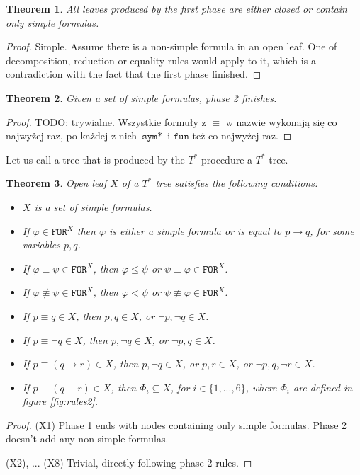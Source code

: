 \documentclass{article}
\newtheorem{theorem}{Theorem}
\theoremstyle{definition}
\newcommand*{\Ts}{T^*}
\newcommand*{\id}{\equiv}
\newcommand*{\ra}{\rightarrow}
\newcommand*{\FOR}{\texttt{FOR}}
\begin{document}
\begin{theorem}
    All leaves produced by the first phase are either closed or contain only simple formulas.
\end{theorem}
\begin{proof}
    Simple. Assume there is a non-simple formula in an open leaf. One of decomposition, reduction or equality rules would apply to it, which is a contradiction with the fact that the first phase finished.
\end{proof}

\begin{theorem}
    Given a set of simple formulas, phase 2 finishes.
\end{theorem}
\begin{proof}
    TODO: trywialne. Wszystkie formuły z $\id$ w nazwie wykonają się co najwyżej raz, po każdej z nich $\texttt{sym}*$ i $\texttt{fun}$ też co najwyżej raz.
\end{proof}

Let us call a tree that is produced by the $\Ts$ procedure a $\Ts$ tree.

\begin{theorem}
    Open leaf $X$ of a $\Ts$ tree satisfies the following conditions:
    \begin{itemize}
        \item [(X1)] $X$ is a set of simple formulas.
        \item [(X2)] If $\varphi \in \FOR^X$ then $\varphi$ is either a simple formula or is equal to $p \ra q$, for some variables $p, q$.
        \item [(X3)] If $\varphi \id \psi \in \FOR^X$, then $\varphi \leq \psi$ or $\psi \id \varphi \in \FOR^X$.
        \item [(X4)] If $\varphi \not \id \psi \in \FOR^X$, then $\varphi < \psi$ or $\psi \not \id \varphi \in \FOR^X$.
        \item [(X5)] If $p \id q \in X$, then $p, q \in X$, or $\lnot p, \lnot q \in X$.
        \item [(X6)] If $p \id \lnot q \in X$, then $p, \lnot q \in X$, or $\lnot p, q \in X$.
        \item [(X7)] If $p \id (q \ra r) \in X$, then $p, \lnot q \in X$, or $p, r \in X$, or $\lnot p, q, \lnot r \in X$.
        \item [(X8)] If $p \id (q \id r) \in X$, then $\Phi_i \subseteq X$, for $i \in \{1, ..., 6\}$, where $\Phi_i$ are defined in figure \ref{fig:rules2}.
    \end{itemize}
\end{theorem}
\begin{proof}
    (X1) Phase 1 ends with nodes containing only simple formulas. Phase 2 doesn't add any non-simple formulas.

    (X2), ... (X8) Trivial, directly following phase 2 rules.
\end{proof}
\end{document}
